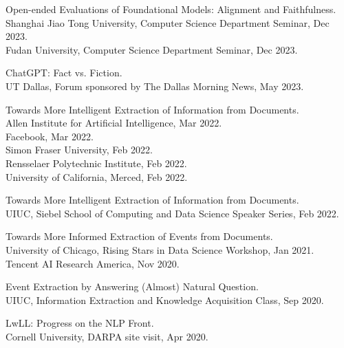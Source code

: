     
    \noindent Open-ended Evaluations of Foundational Models: Alignment and Faithfulness. \\
    \indent Shanghai Jiao Tong University, Computer Science Department Seminar, Dec 2023. \\
    \indent Fudan University, Computer Science Department Seminar, Dec 2023.


    \noindent ChatGPT: Fact vs. Fiction. \\
    \indent UT Dallas, Forum sponsored by The Dallas Morning News, May 2023.


    \noindent Towards More Intelligent Extraction of Information from Documents. \\
    \indent Allen Institute for Artificial Intelligence, Mar 2022. \\
    \indent Facebook, Mar 2022. \\
    \indent Simon Fraser University, Feb 2022. \\
   	\indent Rensselaer Polytechnic Institute, Feb 2022. \\
   	\indent University of California, Merced, Feb 2022. 


    \noindent Towards More Intelligent Extraction of Information from Documents. \\
    \indent UIUC, Siebel School of Computing and Data Science Speaker Series, Feb 2022.

    
    \noindent Towards More Informed Extraction of Events from Documents. \\
    \indent University of Chicago, Rising Stars in Data Science Workshop, Jan 2021. \\
    \indent Tencent AI Research America, Nov 2020.


    \noindent Event Extraction by Answering (Almost) Natural Question. \\
    \indent UIUC, Information Extraction and Knowledge Acquisition Class, Sep 2020.

    
    \noindent LwLL: Progress on the NLP Front. \\
    \indent Cornell University, DARPA site visit, Apr 2020.
    

    
